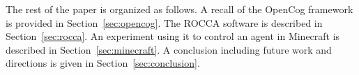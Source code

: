 \documentclass[runningheads]{llncs}
\begin{document}










The rest of the paper is organized as follows.  A recall of the
OpenCog framework is provided in Section~\ref{sec:opencog}.  The ROCCA
software is described in Section~\ref{sec:rocca}.  An experiment using
it to control an agent in Minecraft is described in
Section~\ref{sec:minecraft}.  A conclusion including future work and
directions is given in Section~\ref{sec:conclusion}.
\end{document}
